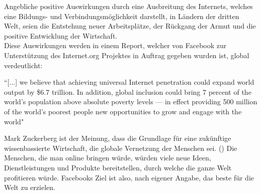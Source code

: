 \documentclass{article}
\begin{document}
\medskip

Angebliche positive Auswirkungen durch eine Ausbreitung des Internets, welches eine Bildungs- und Verbindungsmöglichkeit darstellt, in Ländern der dritten Welt, seien die Entstehung neuer Arbeitsplätze, der Rückgang der Armut und die positive Entwicklung der Wirtschaft.\\
    
Diese Auswirkungen werden in einem Report, welcher von Facebook zur Unterstützung des Internet.org Projektes in Auftrag gegeben wurden ist, global verdeutlicht:
                    
``[...] we believe that achieving universal Internet penetration could expand world output by \$6.7 trillion.  
In addition, global inclusion could bring 7 percent of the world’s population above absolute poverty levels — in effect providing 500 
million of the world’s poorest people new opportunities to grow and engage with the world"
\parencite{connectWorld}

\medskip

Mark Zuckerberg ist der Meinung, dass die Grundlage für eine zukünftige wissenbassierte Wirtschaft, die globale Vernetzung der Menschen sei.
(\cite{HumanRight})
Die Menschen, die man online bringen würde, würden viele neue Ideen, Dienstleistungen und Produkte bereitstellen, durch welche die ganze Welt profitieren würde.
Facebooks Ziel ist also, nach eigener Angabe, das beste für die Welt zu erzielen.
\end{document}
